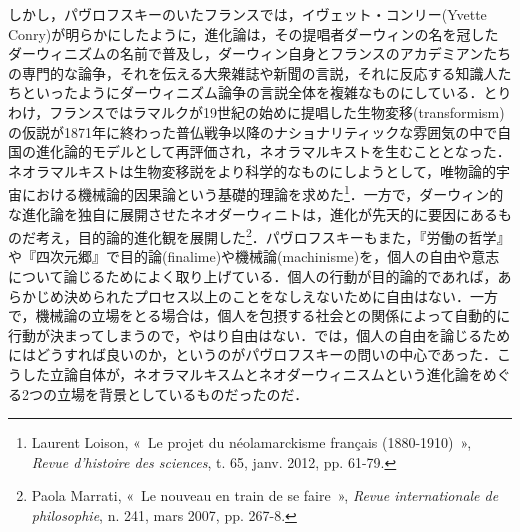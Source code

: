 しかし，パヴロフスキーのいたフランスでは，イヴェット・コンリー(Yvette Conry)が明らかにしたように，進化論は，その提唱者ダーウィンの名を冠したダーウィニズムの名前で普及し，ダーウィン自身とフランスのアカデミアンたちの専門的な論争，それを伝える大衆雑誌や新聞の言説，それに反応する知識人たちといったようにダーウィニズム論争の言説全体を複雑なものにしている．とりわけ，フランスではラマルクが19世紀の始めに提唱した生物変移(transformism)の仮説が1871年に終わった普仏戦争以降のナショナリティックな雰囲気の中で自国の進化論的モデルとして再評価され，ネオラマルキストを生むこととなった．ネオラマルキストは生物変移説をより科学的なものにしようとして，唯物論的宇宙における機械論的因果論という基礎的理論を求めた\footnote{Laurent Loison, «~Le projet du néolamarckisme français (1880-1910)~», \emph{Revue d'histoire des sciences}, t. 65, janv. 2012, pp. 61-79.}．一方で，ダーウィン的な進化論を独自に展開させたネオダーウィニトは，進化が先天的に要因にあるものだ考え，目的論的進化観を展開した\footnote{Paola Marrati, «~Le nouveau en train de se faire~», \emph{Revue internationale de philosophie}, n. 241, mars 2007, pp. 267-8.}．パヴロフスキーもまた，『労働の哲学』や『四次元郷』で目的論(finalime)や機械論(machinisme)を，個人の自由や意志について論じるためによく取り上げている．個人の行動が目的論的であれば，あらかじめ決められたプロセス以上のことをなしえないために自由はない．一方で，機械論の立場をとる場合は，個人を包摂する社会との関係によって自動的に行動が決まってしまうので，やはり自由はない．では，個人の自由を論じるためにはどうすれば良いのか，というのがパヴロフスキーの問いの中心であった．こうした立論自体が，ネオラマルキスムとネオダーウィニスムという進化論をめぐる2つの立場を背景としているものだったのだ． 

